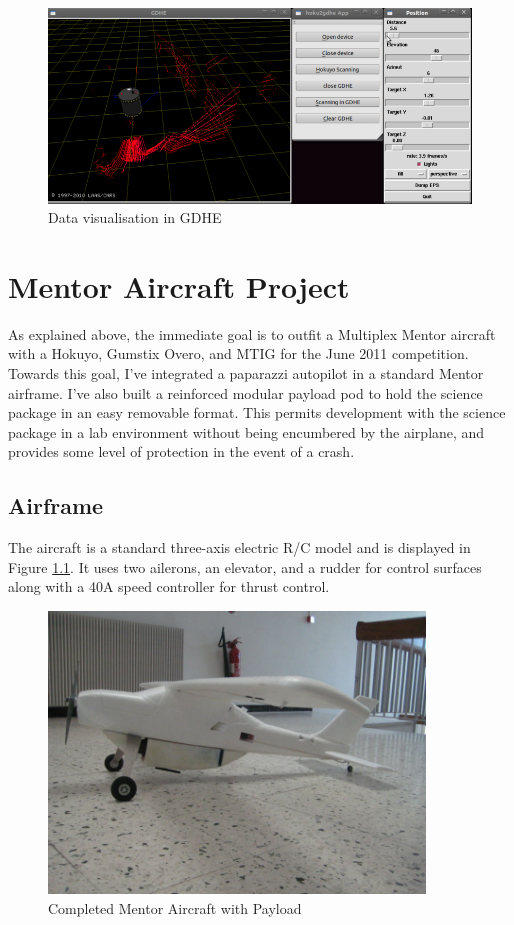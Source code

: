 \documentclass[a4paper,11pt]{report}
\begin{document}
\begin{figure}[ht]
 \centering
 \includegraphics[width=12cm]{./Hoku2gdhe.png}
 \caption{Data visualisation in GDHE}
 \label{fig:hoku2gdhe}
\end{figure}


\chapter{Mentor Aircraft Project}
\label{sec:mentorproject}

As explained above, the immediate goal is to outfit a Multiplex Mentor aircraft with a Hokuyo, Gumstix Overo, and MTIG for the June 2011 competition. Towards this goal, I've integrated a paparazzi autopilot in a standard Mentor airframe. I've also built a reinforced modular payload pod to hold the science package in an easy removable format. This permits development with the science package in a lab environment without being encumbered by the airplane, and provides some level of protection in the event of a crash.

\section{Airframe}

The aircraft is a standard three-axis electric R/C model and is displayed in Figure \ref{fig:mentor}. It uses two ailerons, an elevator, and a rudder for control surfaces along with a 40A speed controller for thrust control.

\begin{figure}[ht]
 \centering
 \includegraphics[width=10cm]{./800px-Mentor1_2.jpg}
 \caption{Completed Mentor Aircraft with Payload}
 \label{fig:mentor}
\end{figure}
\end{document}
